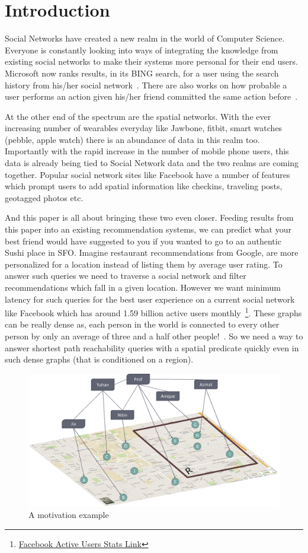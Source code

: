 \section{Introduction}
Social Networks have created a new realm in the world of Computer Science. Everyone is constantly looking into ways of integrating the knowledge from existing social networks to make their systems more personal for their end users. Microsoft now ranks results, in its BING search, for a user using the search history from his/her social network~\cite{M2011}. There are also works on how probable a user performs an action given his/her friend committed the same action before~\cite{DJE2003}. 

At the other end of the spectrum are the spatial networks. With the ever increasing number of wearables everyday like Jawbone, fitbit, smart watches (pebble, apple watch) there is an abundance of data in this realm too. Importantly with the rapid increase in the number of mobile phone users, this data is already being tied to Social Network data and the two realms are coming together. Popular social network sites like Facebook have a number of features which prompt users to add spatial information like checkins, traveling posts, geotagged photos etc.

And this paper is all about bringing these two even closer. Feeding results from this paper into an existing recommendation systems, we can predict what your best friend would have suggested to you if you wanted to go to an authentic Sushi place in SFO. Imagine restaurant recommendations from Google, are more personalized for a location instead of listing them by average user rating. To answer such queries we need to traverse a social network and filter recommendations which fall in a given location. However we want minimum latency for such queries for the best user experience on a current social network like Facebook which has around 1.59 billion active users monthly~\footnote{\href{http://www.statista.com/statistics/264810/number-of-monthly-active-facebook-users-worldwide/}{Facebook Active Users Stats Link}}. These graphs can be really dense as, each person in the world is connected to every other person by only an average of three and a half other people!~\cite{Taa}. So we need a way to answer shortest path reachability queries with a spatial predicate quickly even in such dense graphs (that is conditioned on a region).

\begin{figure}[t]
	\centering
	\includegraphics[width=0.88\linewidth]{images/begin_example.eps}
	\caption{A motivation example}
	\label{fig:begin-example}
\end{figure}

